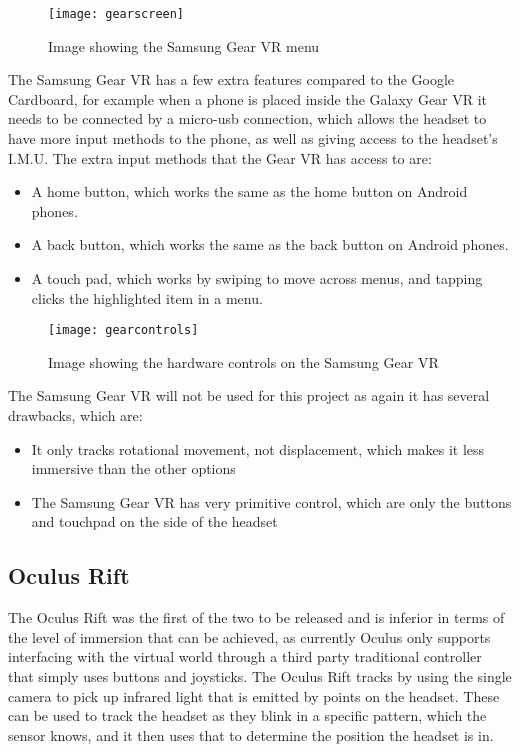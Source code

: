 \begin{figure}[h]
	\texttt{[image: gearscreen]}
	\centering
	\caption{Image showing the Samsung Gear VR menu}
	\label{fig:gearscreen}
\end{figure}

The Samsung Gear VR has a few extra features compared to the Google Cardboard, for example when a phone is placed inside the Galaxy Gear VR it needs to be connected by a micro-usb connection, which allows the headset to have more input methods to the phone, as well as giving access to the headset's I.M.U. The extra input methods that the Gear VR has access to are:\\

\begin{itemize}
	\item A home button, which works the same as the home button on Android phones.
	\item A back button, which works the same as the back button on Android phones.
	\item A touch pad, which works by swiping to move across menus, and tapping clicks the highlighted item in a menu.
\end{itemize}

\begin{figure}[h]
	\texttt{[image: gearcontrols]}
	\centering
	\caption{Image showing the hardware controls on the Samsung Gear VR}
	\label{fig:gearcontrols}
\end{figure}

The Samsung Gear VR will not be used for this project as again it has several drawbacks, which are:

\begin{itemize}
	\item It only tracks rotational movement, not displacement, which makes it less immersive than the other options
	\item The Samsung Gear VR has very primitive control, which are only the buttons and touchpad on the side of the headset
\end{itemize}		


\subsection{Oculus Rift}
The Oculus Rift was the first of the two to be released and is inferior in terms of the level of immersion that can be achieved, as currently Oculus only supports interfacing with the virtual world through a third party traditional controller that simply uses buttons and joysticks. The Oculus Rift tracks by using the single camera to pick up infrared light that is emitted by points on the headset. These can be used to track the headset as they blink in a specific pattern, which the sensor knows, and it then uses that to determine the position the headset is in.

